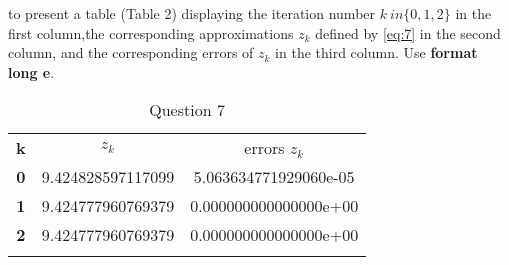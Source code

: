 \documentclass{article}
\begin{document}
to present a table (Table 2) displaying the iteration number $k \ in \{0,1,2\}$ in the first column,the corresponding approximations $z_k$ defined by \ref{eq:7} in the second  column, and the corresponding errors of $z_k$ in the third column. Use {\selectfont \textbf{format long e}}.
\vspace{10mm}

\begin{table}[H]
    \centering
    \begin{tabular}{|c|c|c|}
    \Xhline{1pt}
    \textbf{k} &$z_k$    & \makecell{errors \\ $z_k$}  \\
    \Xhline{2 pt}
    \textbf{0}   &9.424828597117099 & 5.063634771929060e-05\\
    \Xhline{1 pt}
    \textbf{1}   & 9.424777960769379& 0.000000000000000e+00\\
    \Xhline{1 pt}
    \textbf{2}   & 9.424777960769379 & 0.000000000000000e+00\\
    \Xhline{1 pt}
    \end{tabular}
    \caption{Question 7}
    \label{tab:q7}
\end{table}
\end{document}
